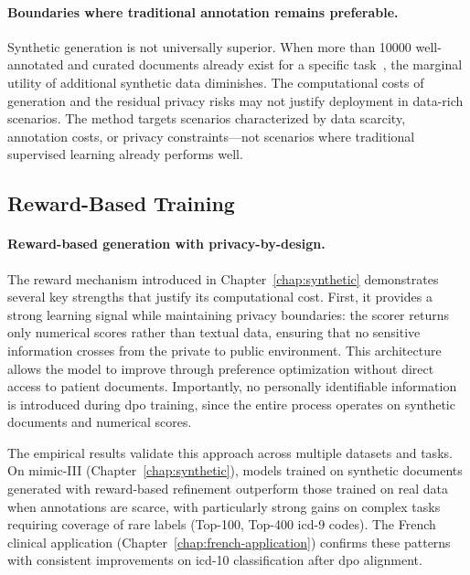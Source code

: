 \paragraph{Boundaries where traditional annotation remains preferable.}

Synthetic generation is not universally superior.
When more than \num{10000} well-annotated and curated documents already exist for a specific task~\citep{zhou2023lima}, the marginal utility of additional synthetic data diminishes.
The computational costs of generation and the residual privacy risks may not justify deployment in data-rich scenarios.
The method targets scenarios characterized by data scarcity, annotation costs, or privacy constraints—not scenarios where traditional supervised learning already performs well.

\subsection{Reward-Based Training}
\paragraph{Reward-based generation with privacy-by-design.}

The reward mechanism introduced in Chapter~\ref{chap:synthetic} demonstrates several key strengths that justify its computational cost.
First, it provides a strong learning signal while maintaining privacy boundaries: the scorer returns only numerical scores rather than textual data, ensuring that no sensitive information crosses from the private to public environment.
This architecture allows the model to improve through preference optimization without direct access to patient documents.
Importantly, no personally identifiable information is introduced during \gls{dpo} training, since the entire process operates on synthetic documents and numerical scores.

The empirical results validate this approach across multiple datasets and tasks.
On \gls{mimic}-III (Chapter~\ref{chap:synthetic}), models trained on synthetic documents generated with reward-based refinement outperform those trained on real data when annotations are scarce, with particularly strong gains on complex tasks requiring coverage of rare labels (Top-100, Top-400 \gls{icd}-9 codes).
The French clinical application (Chapter~\ref{chap:french-application}) confirms these patterns with consistent improvements on \gls{icd}-10 classification after \gls{dpo} alignment.

